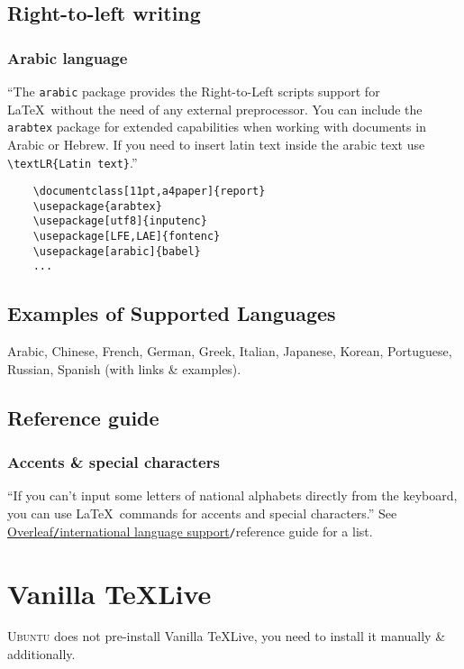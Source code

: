 \documentclass{article}
\numberwithin{equation}{section}
\begin{document}
\subsection{Right-to-left writing}

\subsubsection{Arabic language}
``The \texttt{arabic} package provides the Right-to-Left scripts support for \LaTeX\ without the need of any external preprocessor. You can include the \texttt{arabtex} package for extended capabilities when working with documents in Arabic or Hebrew. If you need to insert latin text inside the arabic text use \verb|\textLR{Latin text}|.''
\begin{verbatim}
	\documentclass[11pt,a4paper]{report}
	\usepackage{arabtex}
	\usepackage[utf8]{inputenc}
	\usepackage[LFE,LAE]{fontenc}
	\usepackage[arabic]{babel}
	...
\end{verbatim}

\subsection{Examples of Supported Languages}
Arabic, Chinese, French, German, Greek, Italian, Japanese, Korean, Portuguese, Russian, Spanish (with links \& examples).

\subsection{Reference guide}

\subsubsection{Accents \& special characters}
``If you can't input some letters of national alphabets directly from the keyboard, you can use \LaTeX\ commands for accents and special characters.'' See \href{https://www.overleaf.com/learn/latex/International_language_support}{Overleaf\texttt{/}international language support}\texttt{/}reference guide for a list.

\section{Vanilla \TeX Live}
\textsc{Ubuntu} does not pre-install Vanilla \TeX Live, you need to install it manually \& additionally.


\printbibliography[heading=bibintoc]
	
\end{document}
